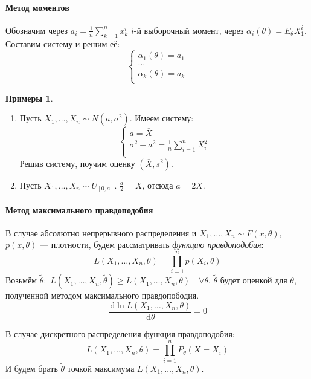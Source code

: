 \documentclass[11pt,openany,a4paper]{scrartcl}
\theoremstyle{plain}
\theoremstyle{definition}
\newtheorem{examples}[theorem]{Примеры}
\newcommand{\dif}{\, \mathrm d}
\newcommand{\ol}{\overline}
\begin{document}
\paragraph{Метод моментов}
    Обозначим через $a_i = \frac{1}{n}\sum\limits_{k=1}^n x_k^i$
    $i$-й выборочный момент, через $\alpha_i(\theta) = E_\theta X_1^i$.
    Составим систему и решим её:
    $$
    \begin{cases}
        \alpha_1(\theta) = a_1 \\
        \ldots \\
        \alpha_k(\theta) = a_k \\
    \end{cases}
    $$

\begin{examples}
\mbox{}
    \begin{enumerate}
        \item Пусть $X_1, \ldots, X_n \sim N(a, \sigma^2)$. Имеем систему:
        $$
        \begin{cases}
            a = \ol X \\
            \sigma^2 + a^2 = \frac{1}{n}\sum\limits_{i=1}^n X_i^2 \\
        \end{cases}
        $$
        Решив систему, поучим оценку $(\ol X, s^2)$.
        \item Пусть $X_1, \ldots, X_n \sim U_{[0, a]}$. $\frac{a}{2} = \ol X$, отсюда $a = 2\ol X$.
    \end{enumerate}
\end{examples}

\paragraph{Метод максимального правдоподобия}
        В случае абсолютно непрерывного распределения и $X_1, \ldots, X_n \sim F(x, \theta)$,
        $p(x, \theta)$ — плотности, будем рассматривать \emph{функцию правдоподобия}:
        $$
        L(X_1, \ldots, X_n, \theta) = \prod\limits_{i=1}^n p(X_i, \theta)
        $$
        Возьмём $\widetilde{\theta}:$ $L(X_1, \ldots, X_n, \widetilde\theta) \geqslant
        L(X_1, \ldots, X_n, \theta)\quad \forall \theta$. $\widetilde\theta$ будет оценкой для $\theta$,
        полученной методом максимального правдопободия.
        $$
        \frac{\dif \ln L(X_1, \ldots, X_n, \theta)}{\dif \theta} = 0
        $$
        
        В случае дискретного распределения функция правдоподобия:
        $$
        L(X_1, \ldots, X_n, \theta) = \prod\limits_{i=1}^n P_\theta(X = X_i)
        $$
        И будем брать $\widetilde\theta$ точкой максимума $L(X_1, \ldots, X_n, \theta)$.
\end{document}
